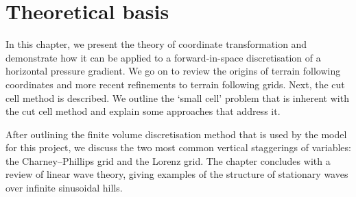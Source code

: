 \chapter{Theoretical basis}
\label{sec:theory}

In this chapter, we present the theory of coordinate transformation and demonstrate how it can be applied to a forward-in-space discretisation of a horizontal pressure gradient.  We go on to review the origins of terrain following coordinates and more recent refinements to terrain following grids.  Next, the cut cell method is described.  We outline the `small cell' problem that is inherent with the cut cell method and explain some approaches that address it.

After outlining the finite volume discretisation method that is used by the model for this project, we discuss the two most common vertical staggerings of variables: the Charney--Phillips grid and the Lorenz grid.  The chapter concludes with a review of linear wave theory, giving examples of the structure of stationary waves over infinite sinusoidal hills.









